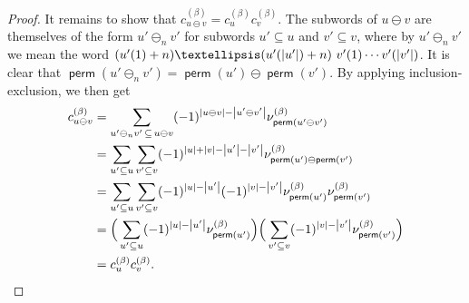 \documentclass[11pt]{article}
\theoremstyle{definition}
\numberwithin{equation}{section}
\newcommand{\sseq}{\subseteq}
\DeclarePairedDelimiter\abs{\lvert}{\rvert}
\DeclareMathOperator{\perm}{\mathsf{perm}}
\begin{document}
\begin{proof}
It remains to show that $c^{(\beta)}_{u\ominus v} = c^{(\beta)}_u c^{(\beta)}_v$.
The subwords of $u\ominus v$ are themselves of the form $u'\ominus_n v'$ for subwords $u'\sseq u$ and $v'\sseq v$,
where by $u'\ominus_n v'$ we mean the word $(u'(1)+n)\dots (u'(\abs*{u'})+n)\ v'(1)\cdots v'(\abs*{v'})$.
It is clear that $\perm(u'\ominus_n v') = \perm(u')\ominus \perm(v')$.
By applying inclusion-exclusion, we then get \begin{align*}
    c^{(\beta)}_{u\ominus v}
    &= \sum_{u'\ominus_n v'\, \sseq\, u\ominus v}
    (-1)^{\abs*{u\ominus v} - \abs*{u'\ominus v'}}
    \nu^{(\beta)}_{\perm(u'\ominus v')} \\
    &= \sum_{u'\sseq u} \sum_{v'\sseq v}
    (-1)^{\abs*{u} + \abs*{v} - \abs*{u'} - \abs*{v'}}
    \nu^{(\beta)}_{\perm(u')\ominus \perm(v')} \\
    &= \sum_{u'\sseq u} \sum_{v'\sseq v}
    (-1)^{\abs*{u}-\abs*{u'}} (-1)^{\abs*{v}-\abs*{v'}}  
    \nu^{(\beta)}_{\perm(u')} \nu^{(\beta)}_{\perm(v')} \\
    &= \Big(
        \sum_{u'\sseq u}
        (-1)^{\abs*{u}-\abs*{u'}} \nu^{(\beta)}_{\perm(u')}
    \Big)
    \Big(
        \sum_{v'\sseq v}
        (-1)^{\abs*{v}-\abs*{v'}} \nu^{(\beta)}_{\perm(v')}
    \Big) \\
    &= c^{(\beta)}_u c^{(\beta)}_v. \qedhere
\end{align*}
\end{proof}
\end{document}
